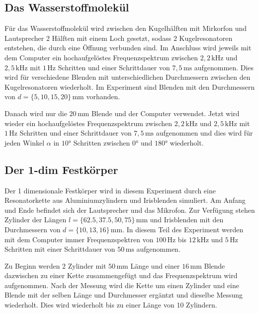\subsection{Das Wasserstoffmolekül}
\label{sec:d_H2}

Für das Wasserstoffmolekül wird zwischen den Kugelhälften mit Mirkorfon und Lautsprecher 2 Hälften mit einem Loch gesetzt, sodass 2 Kugelresonatoren entstehen, die durch eine Öffnung verbunden sind. Im Anschluss wird jeweils mit dem Computer ein hochaufgelöstes Frequenzspektrum zwischen $2, \! 2 \, \mathrm{kHz}$ und $2, \! 5 \, \mathrm{kHz}$ mit $1 \, \mathrm{Hz}$ Schritten und einer Schrittdauer von $7, \! 5 \, \mathrm{ms}$ aufgenommen. Dies wird für verschiedene Blenden mit unterschiedlichen Durchmessern zwischen den Kugelresonatoren wiederholt. Im Experiment sind Blenden mit den Durchmessern von $d = \{ 5, 10, 15, 20 \} \, \mathrm{mm}$ vorhanden. \newline

Danach wird nur die $20 \, \mathrm{mm}$ Blende und der Computer verwendet. Jetzt wird wieder ein hochaufgelöstes Frequenzspektrum zwischen $2, \! 2 \, \mathrm{kHz}$ und $2, \! 5 \, \mathrm{kHz}$ mit $1 \, \mathrm{Hz}$ Schritten und einer Schrittdauer von $7, \! 5 \, \mathrm{ms}$ aufgenommen und dies wird für jeden Winkel $\alpha$ in $10°$ Schritten zwischen $0°$ und $180°$ wiederholt.

\subsection{Der 1-dim Festkörper}
\label{sec:d_fk}

Der 1 dimensionale Festkörper wird in diesem Experiment durch eine Resonatorkette aus Aluminiumzylindern und Irisblenden simuliert. Am Anfang und Ende befindet sich der Lautsprecher und das Mikrofon. Zur Verfügung stehen Zylinder der Längen $l = \{ 62.5, 37.5, 50, 75 \} \, \mathrm{mm}$ und Irisblenden mit den Durchmessern von $d = \{ 10, 13, 16 \} \, \mathrm{mm}$. In diesem Teil des Experiment werden mit dem Computer immer Frequenzspektren von $100 \, \mathrm{Hz}$ bis $12 \, \mathrm{kHz}$ und $5 \, \mathrm{Hz}$ Schritten mit einer Schrittdauer von $50 \, \mathrm{ms}$ aufgenommen. \newline

Zu Beginn werden 2 Zylinder mit $50 \, \mathrm{mm}$ Länge und einer $16 \, \mathrm{mm}$ Blende dazwischen zu einer Kette zusammengefügt und das Frequenzspektrum wird aufgenommen. Nach der Messung wird die Kette um einen Zylinder und eine Blende mit der selben Länge und Durchmesser ergäntzt und dieselbe Messung wiederholt. Dies wird wiederholt bis zu einer Länge von 10 Zylindern. \newline

